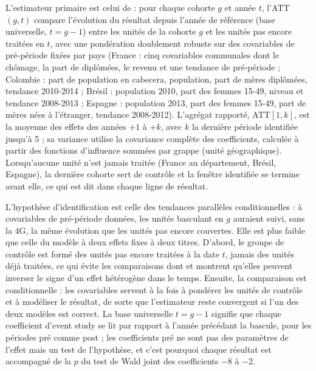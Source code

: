 \documentclass[11pt,a4paper]{article}
\begin{document}
L'estimateur primaire est celui de \citet{callaway2021} : pour chaque cohorte $g$ et année $t$, l'ATT$(g,t)$ compare l'évolution du résultat depuis l'année de référence (base universelle, $t=g-1$) entre les unités de la cohorte $g$ et les unités pas encore traitées en $t$, avec une pondération doublement robuste sur des covariables de pré-période fixées par pays (France : cinq covariables communales dont le chômage, la part de diplômées, le revenu et une tendance de pré-période ; Colombie : part de population en cabecera, population, part de mères diplômées, tendance 2010-2014 ; Brésil : population 2010, part des femmes 15-49, niveau et tendance 2008-2013 ; Espagne : population 2013, part des femmes 15-49, part de mères nées à l'étranger, tendance 2008-2012). L'agrégat rapporté, ATT$[1,k]$, est la moyenne des effets des années $+1$ à $+k$, avec $k$ la dernière période identifiée jusqu'à 5 ; sa variance utilise la covariance complète des coefficients, calculée à partir des fonctions d'influence sommées par grappe (unité géographique). Lorsqu'aucune unité n'est jamais traitée (France au département, Brésil, Espagne), la dernière cohorte sert de contrôle et la fenêtre identifiée se termine avant elle, ce qui est dit dans chaque ligne de résultat.

L'hypothèse d'identification est celle des tendances parallèles conditionnelles : à covariables de pré-période données, les unités basculant en $g$ auraient suivi, sans la 4G, la même évolution que les unités pas encore couvertes. Elle est plus faible que celle du modèle à deux effets fixes à deux titres. D'abord, le groupe de contrôle est formé des unités pas encore traitées à la date $t$, jamais des unités déjà traitées, ce qui évite les comparaisons dont \citet{dechaisemartin2020} et \citet{roth2023} montrent qu'elles peuvent inverser le signe d'un effet hétérogène dans le temps. Ensuite, la comparaison est conditionnelle : les covariables servent à la fois à pondérer les unités de contrôle et à modéliser le résultat, de sorte que l'estimateur reste convergent si l'un des deux modèles est correct. La base universelle $t = g-1$ signifie que chaque coefficient d'event study se lit par rapport à l'année précédant la bascule, pour les périodes pré comme post ; les coefficients pré ne sont pas des paramètres de l'effet mais un test de l'hypothèse, et c'est pourquoi chaque résultat est accompagné de la $p$ du test de Wald joint des coefficients $-8$ à $-2$.
\end{document}
